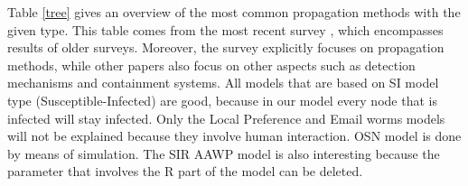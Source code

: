 Table \ref{tree} gives an overview of the most common propagation methods with the given type. This table comes from the most recent survey \citep{wang2014modeling}, which encompasses results of older surveys. Moreover, the survey explicitly focuses on propagation methods, while other papers also focus on other aspects such as  detection mechanisms and containment systems. All models that are based on SI model type (Susceptible-Infected) are good, because in our model every node that is infected will stay infected. Only the Local Preference and Email worms models will not be explained because they involve human interaction. OSN model is done by means of simulation. The SIR AAWP model is also interesting because the parameter that involves the R part of the model can be deleted.  \\ 









